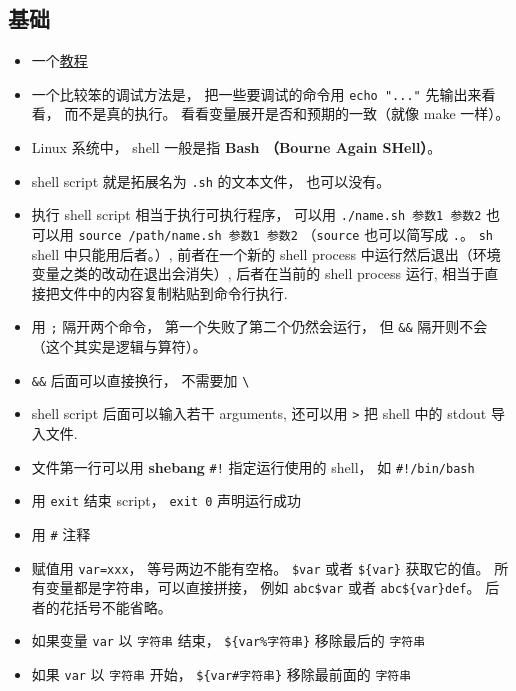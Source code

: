 
\begin{issues}
\issueDraft
\end{issues}


\subsection{基础}
\begin{itemize}
\item 一个\href{https://tldp.org/LDP/abs/html/why-shell.html}{教程}
\item 一个比较笨的调试方法是， 把一些要调试的命令用 \verb|echo "..."| 先输出来看看， 而不是真的执行。 看看变量展开是否和预期的一致（就像 make 一样）。
\item Linux 系统中， shell 一般是指 \textbf{Bash （Bourne Again SHell）}。
\item shell script 就是拓展名为 \verb`.sh` 的文本文件， 也可以没有。
\item 执行 shell script 相当于执行可执行程序， 可以用 \verb`./name.sh 参数1 参数2` 也可以用 \verb`source /path/name.sh 参数1 参数2` （\verb|source| 也可以简写成 \verb|.|。 \verb|sh| shell 中只能用后者。）, 前者在一个新的 shell process 中运行然后退出（环境变量之类的改动在退出会消失）, 后者在当前的 shell process 运行, 相当于直接把文件中的内容复制粘贴到命令行执行.
\item 用 \verb|;| 隔开两个命令， 第一个失败了第二个仍然会运行， 但 \verb|&&| 隔开则不会（这个其实是逻辑与算符）。
\item \verb|&&| 后面可以直接换行， 不需要加 \verb|\|
\item shell script 后面可以输入若干 arguments, 还可以用 \verb`>` 把 shell 中的 stdout 导入文件.
\item 文件第一行可以用 \textbf{shebang} \verb`#!` 指定运行使用的 shell， 如 \verb`#!/bin/bash`
\item 用 \verb|exit| 结束 script， \verb`exit 0` 声明运行成功
\item 用 \verb`#` 注释
\item 赋值用 \verb`var=xxx`， 等号两边不能有空格。 \verb|$var| 或者 \verb|${var}| 获取它的值。 所有变量都是字符串，可以直接拼接， 例如 \verb|abc$var| 或者 \verb|abc${var}def|。 后者的花括号不能省略。
\item 如果变量 \verb|var| 以 \verb|字符串| 结束， \verb|${var%字符串}| 移除最后的 \verb|字符串|
\item 如果 \verb|var| 以 \verb|字符串| 开始， \verb|${var#字符串}| 移除最前面的 \verb|字符串|

\end{itemize}
